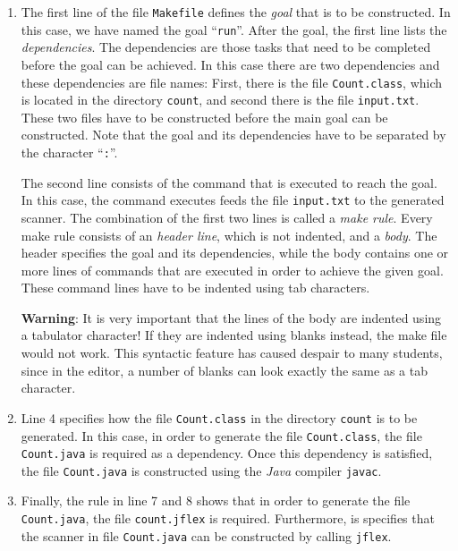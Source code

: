 \begin{enumerate}
\item The first line of the file \texttt{Makefile} defines the \emph{goal} that is to be
      constructed.  In this case, we have named the goal ``\texttt{run}''.  After the 
      goal, the first line lists the \emph{dependencies}.  The dependencies are those
      tasks that need to be completed before the goal can be achieved.
      In this case there are two dependencies and these dependencies are file names: First,
      there is the file \texttt{Count.class}, which is located in the directory \texttt{count}, and
      second there is the file \texttt{input.txt}.  These two files have to be constructed before
      the main goal can be constructed.  Note that the goal and its dependencies have to be
      separated by the character ``\texttt{:}''.

      The second line consists of the command that is executed to reach the goal.  In this case,
      the command executes feeds the file \texttt{input.txt} to the generated scanner.  The
      combination of the first two lines is called a \emph{make rule}.  Every make rule consists of
      an \emph{header line}, which is not indented, and a \emph{body}.  The header specifies the
      goal and its dependencies, while the body contains one or more lines of commands that are
      executed in order to achieve the given goal.  These command lines have to be indented using tab characters.

      \textbf{Warning}:  It is very important that the lines of the body are indented using a tabulator
      character!  If they are indented using blanks instead, the make file would not work.
      This syntactic feature has caused despair to many students, since in the editor,
      a number of blanks can look exactly the same as a tab character.
\item Line 4 specifies how the file \texttt{Count.class} in the directory \texttt{count} is to be
      generated.  In this case, in order to generate the file \texttt{Count.class}, the file
      \texttt{Count.java} is required as a dependency.  Once this dependency is satisfied,
      the file \texttt{Count.java} is constructed using the \textsl{Java} compiler \texttt{javac}.
\item Finally, the rule in line 7 and 8 shows that in order to generate the file
      \texttt{Count.java}, the file \texttt{count.jflex} is required.  Furthermore, is specifies
      that the scanner in file \texttt{Count.java} can be constructed by calling \texttt{jflex}.
\end{enumerate}
